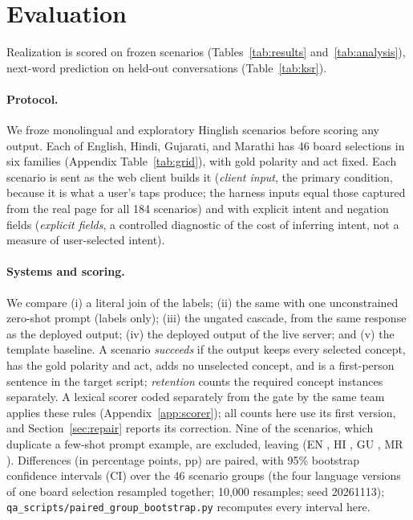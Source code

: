 \section{Evaluation}
\label{sec:eval}

Realization is scored on \NPrimAll{} frozen scenarios (Tables~\ref{tab:results} and~\ref{tab:analysis}), next-word prediction on held-out conversations (Table~\ref{tab:ksr}).

\paragraph{Protocol.}
We froze \NScen{} monolingual and \NScenCM{} exploratory Hinglish scenarios before scoring any output.
Each of English, Hindi, Gujarati, and Marathi has 46 board selections in six families (Appendix Table~\ref{tab:grid}), with gold polarity and act fixed.
Each scenario is sent as the web client builds it (\emph{client input}, the primary condition, because it is what a user's taps produce; the harness inputs equal those captured from the real page for all 184 scenarios) and with explicit intent and negation fields (\emph{explicit fields}, a controlled diagnostic of the cost of inferring intent, not a measure of user-selected intent).

\paragraph{Systems and scoring.}
We compare (i) a literal join of the labels; (ii) the same \qwen{} with one unconstrained zero-shot prompt (labels only); (iii) the ungated cascade, from the same response as the deployed output; (iv) the deployed output of the live server; and (v) the template baseline.
A scenario \emph{succeeds} if the output keeps every selected concept, has the gold polarity and act, adds no unselected concept, and is a first-person sentence in the target script; \emph{retention} counts the \NConc{} required concept instances separately.
A lexical scorer coded separately from the gate by the same team applies these rules (Appendix~\ref{app:scorer}); all counts here use its first version, and Section~\ref{sec:repair} reports its correction.
Nine of the \NScen{} scenarios, which duplicate a few-shot prompt example, are excluded, leaving \NPrimAll{} (EN \NPrimEN{}, HI \NPrimHI{}, GU \NPrimGU{}, MR \NPrimMR{}).
Differences (in percentage points, pp) are paired, with 95\% bootstrap confidence intervals (CI) over the 46 scenario groups (the four language versions of one board selection resampled together; 10,000 resamples; seed 20261113); \texttt{qa\_scripts/paired\_group\_bootstrap.py} recomputes every interval here.

